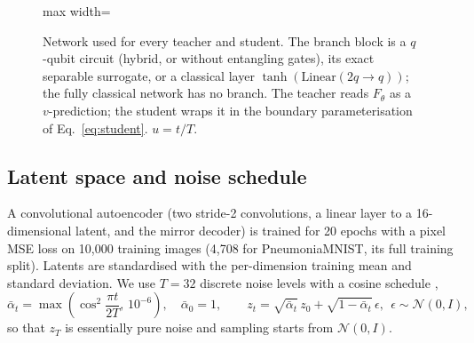 \documentclass[11pt]{article}
\newcommand{\abar}{\bar\alpha}
\begin{document}
\begin{figure}[t]
\centering
\begin{adjustbox}{max width=\textwidth}\end{adjustbox}
\caption{Network used for every teacher and student. The branch block is a
$q$-qubit circuit (hybrid, or without entangling gates), its exact separable
surrogate, or a classical layer $\tanh(\mathrm{Linear}(2q\to q))$; the fully
classical network has no branch. The teacher reads $F_\theta$ as a
$v$-prediction; the student wraps it in the boundary parameterisation of
Eq.~\eqref{eq:student}. $u=t/T$.}
\label{fig:arch}
\end{figure}

\subsection{Latent space and noise schedule}

A convolutional autoencoder (two stride-2 convolutions, a linear layer to a
16-dimensional latent, and the mirror decoder) is trained for 20 epochs with a
pixel MSE loss on 10{,}000 training images (4{,}708 for PneumoniaMNIST, its full
training split). Latents are standardised with the per-dimension training mean
and standard deviation. We use $T=32$ discrete noise levels with a cosine
schedule \citep{nichol2021improved},
\begin{equation}
  \abar_t = \max\!\left(\cos^2\!\frac{\pi t}{2T},\,10^{-6}\right),\quad \abar_0=1,\qquad
  z_t=\sqrt{\abar_t}\,z_0+\sqrt{1-\abar_t}\,\epsilon,\ \ \epsilon\sim\mathcal{N}(0,I),
\end{equation}
so that $z_T$ is essentially pure noise and sampling starts from $\mathcal{N}(0,I)$.
\end{document}
